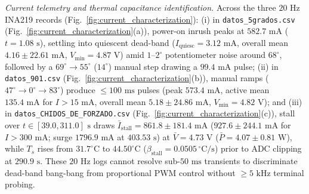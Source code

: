 \documentclass[lettersize,journal]{IEEEtran}
\begin{document}
	\textit{Current telemetry and thermal capacitance identification.} Across the three $20\text{ Hz}$ INA219 records (Fig.~\ref{fig:current_characterization}): (i) in \texttt{datos\_5grados.csv} (Fig.~\ref{fig:current_characterization}(a)), power-on inrush peaks at $582.7\text{ mA}$ ($t = 1.08\text{ s}$), settling into quiescent dead-band ($I_{\text{quiesc}} = 3.12\text{ mA}$, overall mean $4.16 \pm 22.61\text{ mA}$, $V_{\min} = 4.87\text{ V}$) amid $1\text{--}2^\circ$ potentiometer noise around $68^\circ$, followed by a $69^\circ \to 55^\circ$ ($14^\circ$) manual step drawing a $99.4\text{ mA}$ pulse; (ii) in \texttt{datos\_901.csv} (Fig.~\ref{fig:current_characterization}(b)), manual ramps ($47^\circ \to 0^\circ \to 83^\circ$) produce $\le 100\text{ ms}$ pulses (peak $573.4\text{ mA}$, active mean $135.4\text{ mA}$ for $I > 15\text{ mA}$, overall mean $5.18 \pm 24.86\text{ mA}$, $V_{\min} = 4.82\text{ V}$); and (iii) in \texttt{datos\_CHIDOS\_DE\_FORZADO.csv} (Fig.~\ref{fig:current_characterization}(c)), stall over $t \in [39.0, 311.0]\text{ s}$ draws $\bar{I}_{\text{stall}} = 861.8 \pm 181.4\text{ mA}$ ($927.6 \pm 244.1\text{ mA}$ for $I > 300\text{ mA}$; surge $1796.9\text{ mA}$ at $403.53\text{ s}$) at $\bar{V} = 4.73\text{ V}$ ($\bar{P} = 4.07 \pm 0.81\text{ W}$), while $T_s$ rises from $31.7^\circ\text{C}$ to $44.50^\circ\text{C}$ ($\beta_{\text{stall}} = 0.0505\,^\circ\text{C/s}$) prior to ADC clipping at $290.9\text{ s}$. These $20\text{ Hz}$ logs cannot resolve sub-$50\text{ ms}$ transients to discriminate dead-band bang-bang from proportional PWM control without $\ge 5\text{ kHz}$ terminal probing.
	
\end{document}
